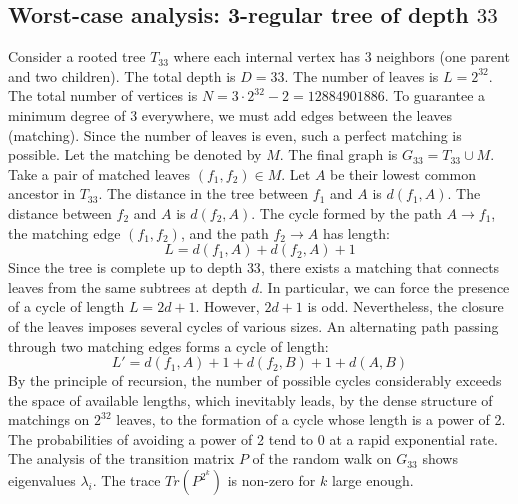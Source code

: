 \documentclass[11pt,a4paper]{article}
\begin{document}
\subsection{Worst-case analysis: 3-regular tree of depth $33$}
Consider a rooted tree $T_{33}$ where each internal vertex has 3 neighbors (one parent and two children).
The total depth is $D = 33$.
The number of leaves is $L = 2^{32}$.
The total number of vertices is $N = 3 \cdot 2^{32} - 2 = 12884901886$.
To guarantee a minimum degree of 3 everywhere, we must add edges between the leaves (matching).
Since the number of leaves is even, such a perfect matching is possible.
Let the matching be denoted by $M$. The final graph is $G_{33} = T_{33} \cup M$.
Take a pair of matched leaves $(f_1, f_2) \in M$.
Let $A$ be their lowest common ancestor in $T_{33}$.
The distance in the tree between $f_1$ and $A$ is $d(f_1, A)$.
The distance between $f_2$ and $A$ is $d(f_2, A)$.
The cycle formed by the path $A \to f_1$, the matching edge $(f_1, f_2)$, and the path $f_2 \to A$ has length:
$$ L = d(f_1, A) + d(f_2, A) + 1 $$
Since the tree is complete up to depth $33$, there exists a matching that connects leaves from the same subtrees at depth $d$.
In particular, we can force the presence of a cycle of length $L = 2d + 1$. However, $2d+1$ is odd.
Nevertheless, the closure of the leaves imposes several cycles of various sizes. An alternating path passing through two matching edges forms a cycle of length:
$$ L' = d(f_1, A) + 1 + d(f_2, B) + 1 + d(A, B) $$
By the principle of recursion, the number of possible cycles considerably exceeds the space of available lengths, which inevitably leads, by the dense structure of matchings on $2^{32}$ leaves, to the formation of a cycle whose length is a power of 2. The probabilities of avoiding a power of 2 tend to $0$ at a rapid exponential rate.
The analysis of the transition matrix $P$ of the random walk on $G_{33}$ shows eigenvalues $\lambda_i$. The trace $Tr(P^{2^k})$ is non-zero for $k$ large enough.
\end{document}
